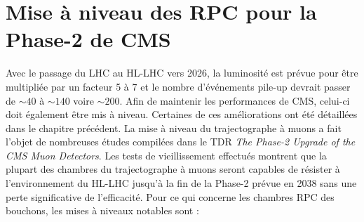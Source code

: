 \section{Mise à niveau des RPC pour la Phase-2 de CMS}
Avec le passage du LHC au HL-LHC vers 2026, la luminosité est prévue pour être multipliée par un facteur \num{5} à \num{7} et le nombre d'événements pile-up devrait passer de $\sim 40$ à $\sim 140$ voire $\sim 200$. Afin de maintenir les performances de CMS, celui-ci doit également être mis à niveau. Certaines de ces améliorations ont été détaillées dans le chapitre précédent. La mise à niveau du trajectographe à muons a fait l'objet de nombreuses études compilées dans le TDR \textit{The Phase-2 Upgrade of the CMS Muon Detectors}. Les tests de vieillissement effectués montrent que la plupart des chambres du trajectographe à muons seront capables de résister à l'environnement du HL-LHC jusqu'à la fin de la Phase-2 prévue en \num{2038} sans une perte significative de l'efficacité. Pour ce qui concerne les chambres RPC des bouchons, les mises à niveaux notables sont :

